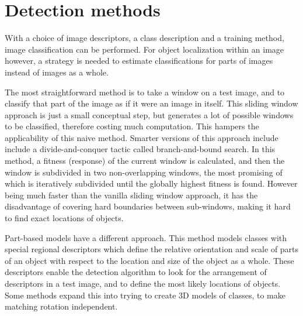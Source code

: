 \section{Detection methods} %
\label{sub:detection_methods}
With a choice of image descriptors, a class description and a training method, image classification can be performed. For object localization within an image however, a strategy is needed to estimate classifications for parts of images instead of images as a whole.

The most straightforward method is to take a window on a test image, and to classify that part of the image as if it were an image in itself. This sliding window approach  is just a small conceptual step, but generates a lot of possible windows to be classified, therefore costing much computation. This hampers the applicability of this naive method. Smarter versions of this approach include include a divide-and-conquer tactic called branch-and-bound search. \cite{lampert2008beyond} In this method, a fitness (response) of the current window is calculated, and then the window is subdivided in two non-overlapping windows, the most promising of which is iteratively subdivided until the globally highest fitness is found. However being much faster than the vanilla sliding window approach, it has the disadvantage of covering hard boundaries between sub-windows, making it hard to find exact locations of objects.

Part-based models have a different approach. This method models classes with special regional descriptors which define the relative orientation and scale of parts of an object with respect to the location and size of the object as a whole. \cite{leibe2004combined, chum2007exemplar, felzenszwalb2010object} These descriptors enable the detection algorithm to look for the arrangement of descriptors in a test image, and to define the most likely locations of objects. Some methods expand this into trying to create 3D models of classes, to make matching rotation independent. 

